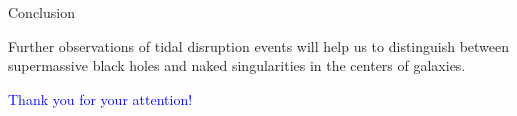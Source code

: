 \documentclass[12pt,aspectratio=139, slidestop,notes=hide]{beamer}
\begin{document}
\begin{frame}
{\centerline{Conclusion}}

\vspace{4ex}\large{
Further observations of tidal disruption events will help us to distinguish between supermassive black holes and naked singularities in the centers of galaxies.}

\vspace{4ex}\Large{
\textcolor{blue}{\qquad\qquad Thank you for your attention!}}

\end{frame}
\end{document}
